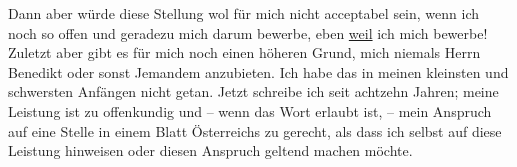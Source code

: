                Dann aber würde diese Stellung wol für mich nicht acceptabel sein, wenn ich noch so
               offen und geradezu mich darum bewerbe, {\dotstwo} eben \uline{weil} ich mich bewerbe! Zuletzt aber gibt es für mich
               noch einen höheren Grund, mich \strikeout{\textcolor{gray}{×}\-\textcolor{gray}{×}\-\textcolor{gray}{×}\-\textcolor{gray}{×}\-\textcolor{gray}{×}\-\textcolor{gray}{×}\-\textcolor{gray}{×}\-\textcolor{gray}{×}\-\textcolor{gray}{×}\-\textcolor{gray}{×}\-\textcolor{gray}{×}\-\textcolor{gray}{×}\-\textcolor{gray}{×}\-\textcolor{gray}{×}\-\textcolor{gray}{×}\-\textcolor{gray}{×}\-\textcolor{gray}{×}\-\textcolor{gray}{×}\-\textcolor{gray}{×}\-\textcolor{gray}{×}} niemals Herrn Benedikt oder sonst
               Jemandem anzubieten. Ich habe das in meinen kleinsten und schwersten Anfängen nicht
               getan. Jetzt schreibe ich seit achtzehn Jahren; meine Leistung ist zu offenkundig und
               – wenn das Wort erlaubt ist, – mein Anspruch auf eine Stelle in einem Blatt Österreichs zu gerecht, als dass ich selbst auf
               diese Leistung hinweisen oder diesen Anspruch geltend machen möchte.\pend
           
